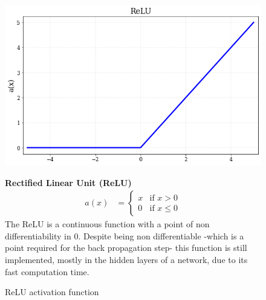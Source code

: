 \begin{figure}[!h]
\begin{minipage}{0.45\textwidth}
    \centering
\includegraphics[width=\textwidth]{sections/03/Images/ReLU.png}
\caption{ReLU activation function}
    \label{fig:act_relu}
\end{minipage}
\hfill
\begin{minipage}{0.5\textwidth}
    \textbf{Rectified Linear Unit (ReLU)}
   \begin{align}
        a(x) &=
        \begin{cases}
        x   & \text{if } x > 0 \\
        0  & \text{if } x \leq 0 
  \end{cases}
\end{align}
The ReLU \cite{relu} is a continuous function with a point of non differentiability in 0. Despite being non differentiable -which is a point required for the back propagation step- this function is still implemented, mostly in the hidden layers of a network, due to its fast computation time. 
\end{minipage}
\end{figure}  



